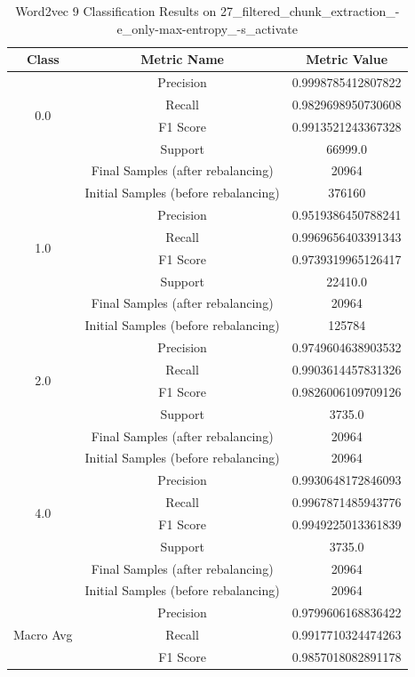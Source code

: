\begin{longtable}{|c|c|c|}
\caption{Word2vec 9 Classification Results on 27\_filtered\_chunk\_extraction\_-e\_only-max-entropy\_-s\_activate} \label{tab:27_filtered_chunk_extraction_-e_only-max-entropy_-s_activate_word2vec_9_classifiers_results} \\
\hline
Class & Metric Name & Metric Value \\
\hline
\multirow{4}{*}{0.0} & Precision & 0.9998785412807822 \\
 & Recall & 0.9829698950730608 \\
 & F1 Score & 0.9913521243367328 \\
 & Support & 66999.0 \\
 & Final Samples (after rebalancing) & 20964 \\
 & Initial Samples (before rebalancing) & 376160 \\
\hline
\multirow{4}{*}{1.0} & Precision & 0.9519386450788241 \\
 & Recall & 0.9969656403391343 \\
 & F1 Score & 0.9739319965126417 \\
 & Support & 22410.0 \\
 & Final Samples (after rebalancing) & 20964 \\
 & Initial Samples (before rebalancing) & 125784 \\
\hline
\multirow{4}{*}{2.0} & Precision & 0.9749604638903532 \\
 & Recall & 0.9903614457831326 \\
 & F1 Score & 0.9826006109709126 \\
 & Support & 3735.0 \\
 & Final Samples (after rebalancing) & 20964 \\
 & Initial Samples (before rebalancing) & 20964 \\
\hline
\multirow{4}{*}{4.0} & Precision & 0.9930648172846093 \\
 & Recall & 0.9967871485943776 \\
 & F1 Score & 0.9949225013361839 \\
 & Support & 3735.0 \\
 & Final Samples (after rebalancing) & 20964 \\
 & Initial Samples (before rebalancing) & 20964 \\
\hline
\multirow{4}{*}{Macro Avg} & Precision & 0.9799606168836422 \\
 & Recall & 0.9917710324474263 \\
 & F1 Score & 0.9857018082891178 \\

\end{longtable}
